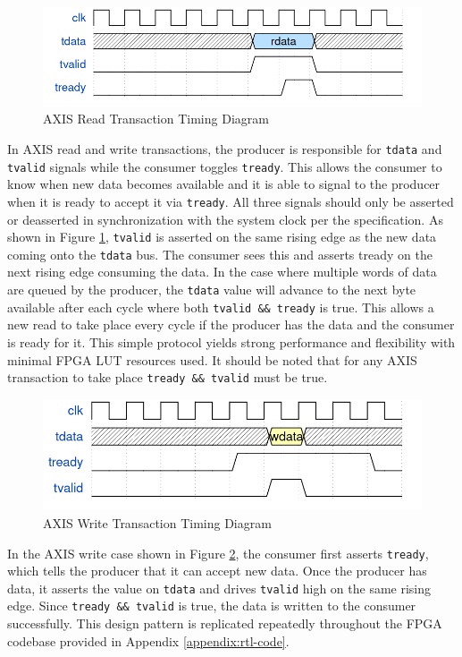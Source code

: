 \documentclass[letterpaper,11pt]{article}
\newcommand{\code}[1]{\texttt{#1}}
\begin{document}
\begin{figure}[H]
  \centering
  \includegraphics[width=\textwidth]{figures/axis_read.png}
  \caption{AXIS Read Transaction Timing Diagram}
  \label{fig:axis-read}
\end{figure}

In AXIS read and write transactions, the producer is responsible for
\code{tdata} and \code{tvalid} signals while the consumer toggles \code{tready}.
This allows the consumer to know when new data becomes available and it is able
to signal to the producer when it is ready to accept it via \code{tready}. All
three signals should only be asserted or deasserted in synchronization with the
system clock per the specification. As shown in Figure \ref{fig:axis-read},
\code{tvalid} is asserted on the same rising edge as the new data coming onto
the \code{tdata} bus. The consumer sees this and asserts tready on the next
rising edge consuming the data. In the case where multiple words of data are
queued by the producer, the \code{tdata} value will advance to the next byte
available after each cycle where both \code{tvalid \&\& tready} is true. This
allows a new read to take place every cycle if the producer has the data and the
consumer is ready for it. This simple protocol yields strong performance and
flexibility with minimal FPGA LUT resources used. It should be noted that for
any AXIS transaction to take place \code{tready \&\& tvalid} must be true.

\begin{figure}[H]
  \centering
  \includegraphics[width=\textwidth]{figures/axis_write.png}
  \caption{AXIS Write Transaction Timing Diagram}
  \label{fig:axis-write}
\end{figure}

In the AXIS write case shown in Figure \ref{fig:axis-write}, the consumer first
asserts \code{tready}, which tells the producer that it can accept new data.
Once the producer has data, it asserts the value on \code{tdata} and drives
\code{tvalid} high on the same rising edge. Since \code{tready \&\& tvalid} is
true, the data is written to the consumer successfully. This design pattern is
replicated repeatedly throughout the FPGA codebase provided in Appendix
\ref{appendix:rtl-code}.
\end{document}
